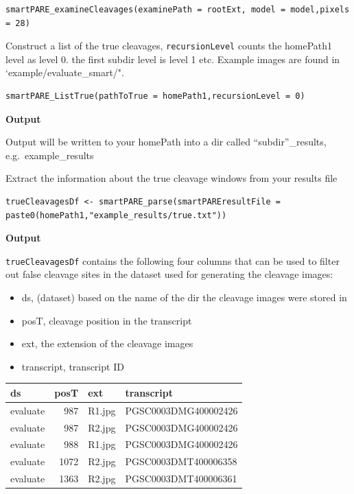 \documentclass[
]{article}
\providecommand{\tightlist}{%
  \setlength{\itemsep}{0pt}\setlength{\parskip}{0pt}}
\begin{document}
\begin{verbatim}
smartPARE_examineCleavages(examinePath = rootExt, model = model,pixels = 28) 
\end{verbatim}

Construct a list of the true cleavages, \texttt{recursionLevel} counts
the homePath1 level as level 0. the first subdir level is level 1 etc.
Example images are found in `example/evaluate\_smart/".

\begin{verbatim}
smartPARE_ListTrue(pathToTrue = homePath1,recursionLevel = 0)  
\end{verbatim}

\textbf{Output}

Output will be written to your homePath into a dir called
``subdir''\_results, e.g.~example\_results

Extract the information about the true cleavage windows from your
results file

\begin{verbatim}
trueCleavagesDf <- smartPARE_parse(smartPAREresultFile = paste0(homePath1,"example_results/true.txt"))
\end{verbatim}

\textbf{Output}

\texttt{trueCleavagesDf} contains the following four columns that can be
used to filter out false cleavage sites in the dataset used for
generating the cleavage images:

\begin{itemize}
\tightlist
\item
  ds, (dataset) based on the name of the dir the cleavage images were
  stored in
\item
  posT, cleavage position in the transcript
\item
  ext, the extension of the cleavage images\\
\item
  transcript, transcript ID
\end{itemize}

\begin{longtable}[]{@{}lrll@{}}
\toprule
ds & posT & ext & transcript\tabularnewline
\midrule
\endhead
evaluate & 987 & R1.jpg & PGSC0003DMG400002426\tabularnewline
evaluate & 987 & R2.jpg & PGSC0003DMG400002426\tabularnewline
evaluate & 988 & R1.jpg & PGSC0003DMG400002426\tabularnewline
evaluate & 1072 & R2.jpg & PGSC0003DMT400006358\tabularnewline
evaluate & 1363 & R2.jpg & PGSC0003DMT400006361\tabularnewline
\bottomrule
\end{longtable}
\end{document}
